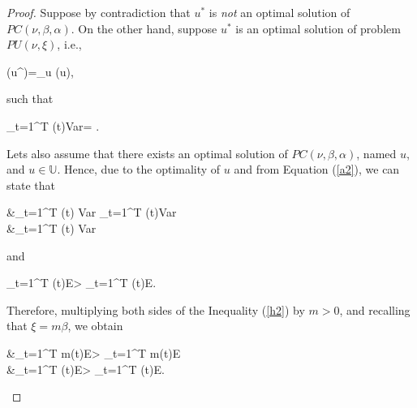 \begin{proof}
	Suppose by contradiction that $u^{*}$ is \emph{not} an optimal solution of $PC(\nu,\beta,\alpha)$. %
	On the other hand, suppose $u^{*}$ is an optimal solution of problem $PU(\nu,\xi)$, i.e.,
	\begin{flalign}	\label{a1}
		(u^{\ast })=\min_{u\in {}} (u),
	\end{flalign}			
	such that 
	\begin{flalign}	\label{a2}
		\sum_{t=1}^{T} \nu(t)Var\left[y^{u^*}(t)\right] = \alpha.
	\end{flalign}	

	Lets also assume that there exists an optimal solution of $PC(\nu,\beta,\alpha)$, named  $u$, and $u\in \mathbb{U}$.
	Hence, due to the optimality of $u$ and from Equation (\ref{a2}), we can state that
%
	\begin{flalign}	\label{h1}	
		&\sum_{t=1}^{T} \nu(t) Var\left[y^{u}(t)\right] \leqslant 
		\sum_{t=1}^{T} \nu(t)Var\left[y^{u^*}(t)\right] \Leftrightarrow \nonumber \\
		&\sum_{t=1}^{T} \nu(t) Var\left[y^{u}(t)\right] \leqslant  \alpha
	\end{flalign}	
and 
	\begin{flalign}	\label{h2}
		\sum_{t=1}^{T} \beta(t)E\left[y^{u}(t)\right] > \sum_{t=1}^{T} 
		\beta(t)E\left[y^{u^{*}} (t)\right]. 
	\end{flalign}
	
	Therefore, multiplying both sides of the Inequality (\ref{h2})  by $m>0$, and recalling that $\xi=m\beta$, we obtain 
	\begin{flalign}	\label{h3}
		&\sum_{t=1}^{T} m\beta(t)E\left[y^{u}(t)\right] > \sum_{t=1}^{T} m\beta(t)E\left[y^{u^{*}} (t)\right] \Leftrightarrow \nonumber \\
		&\sum_{t=1}^{T} \xi(t)E\left[y^{u}(t)\right] > \sum_{t=1}^{T} \xi(t)E\left[y^{u^{*}} (t)\right].
	\end{flalign}


\end{proof}
